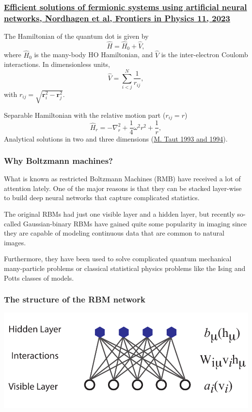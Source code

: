 \documentclass{beamer}
\begin{document}
\begin{frame}
\frametitle{\href{{https://doi.org/10.3389/fphy.2023.1061580}}{Efficient solutions of fermionic systems using artificial neural networks, Nordhagen et al, Frontiers in Physics 11, 2023}}

The Hamiltonian of the quantum dot is given by
\[ \hat{H} = \hat{H}_0 + \hat{V}, 
\]
where $\hat{H}_0$ is the many-body HO Hamiltonian, and $\hat{V}$ is the
inter-electron Coulomb interactions. In dimensionless units,
\[ \hat{V}= \sum_{i < j}^N \frac{1}{r_{ij}},
\]
with $r_{ij}=\sqrt{\mathbf{r}_i^2 - \mathbf{r}_j^2}$.

Separable Hamiltonian with the relative motion part ($r_{ij}=r$)
\[ 
\hat{H}_r=-\nabla^2_r + \frac{1}{4}\omega^2r^2+ \frac{1}{r},
\]
Analytical solutions in two and three dimensions (\href{{https://journals.aps.org/pra/abstract/10.1103/PhysRevA.48.3561}}{M. Taut 1993 and 1994}).
\end{frame}

\begin{frame}
\frametitle{Why Boltzmann machines?}

What is known as restricted Boltzmann Machines (RMB) have received a
lot of attention lately.  One of the major reasons is that they can be
stacked layer-wise to build deep neural networks that capture
complicated statistics.

The original RBMs had just one visible layer and a hidden layer, but
recently so-called Gaussian-binary RBMs have gained quite some
popularity in imaging since they are capable of modeling continuous
data that are common to natural images.

Furthermore, they have been used to solve complicated quantum
mechanical many-particle problems or classical statistical physics
problems like the Ising and Potts classes of models.
\end{frame}

\begin{frame}
\frametitle{The structure of the RBM network}

\vspace{6mm}

\centerline{\includegraphics[width=1.0\linewidth]{figures/RBM.pdf}}

\vspace{6mm}
\end{frame}
\end{document}
